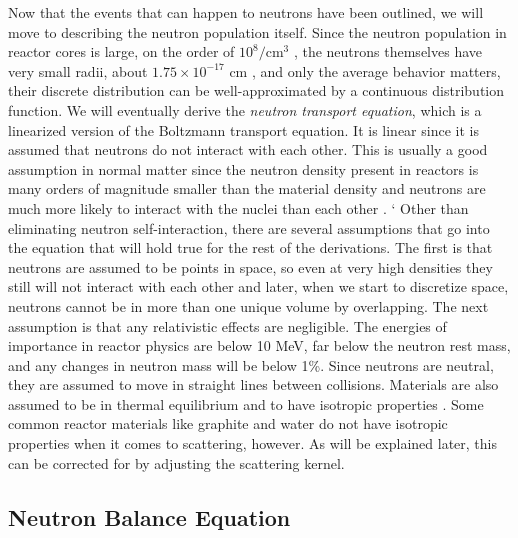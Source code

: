Now that the events that can happen to neutrons have been outlined, we will move to describing the neutron population itself.  Since the neutron population in reactor cores is large, on the order of $10^{8}/\mathrm{cm}^3$ \cite{duderstadt}, the neutrons themselves have very small radii, about $1.75\times10^{-17}$ cm \cite{krane}, and only the average behavior matters, their discrete distribution can be well-approximated by a continuous distribution function.  We will eventually derive the \emph{neutron transport equation}, which is a linearized version of the Boltzmann transport equation.  It is linear since it is assumed that neutrons do not interact with each other.  This is usually a good assumption in normal matter since the neutron density present in reactors is many orders of magnitude smaller than the material density and neutrons are much more likely to interact with the nuclei than each other \cite{duderstadt}.  
`
Other than eliminating neutron self-interaction, there are several assumptions that go into the equation that will hold true for the rest of the derivations.  The first is that neutrons are assumed to be points in space, so even at very high densities they still will not interact with each other and later, when we start to discretize space, neutrons cannot be in more than one unique volume by overlapping.  The next assumption is that any relativistic effects are negligible.  The energies of importance in reactor physics are below 10 MeV, far below the neutron rest mass, and any changes in neutron mass will be below 1\%.  Since neutrons are neutral, they are assumed to move in straight lines between collisions.  Materials are also assumed to be in thermal equilibrium and to have isotropic properties \cite{duderstadt}.  Some common reactor materials like graphite and water do not have isotropic properties when it comes to scattering, however.  As will be explained later, this can be corrected for by adjusting the scattering kernel.

\subsection{Neutron Balance Equation}

